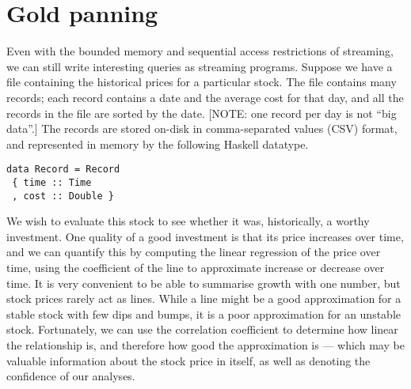 

\section{Gold panning}
Even with the bounded memory and sequential access restrictions of streaming, we can still write interesting queries as streaming programs.
Suppose we have a file containing the historical prices for a particular stock.
The file contains many records; each record contains a date and the average cost for that day, and all the records in the file are sorted by the date.
[NOTE: one record per day is not ``big data''.]
The records are stored on-disk in comma-separated values (CSV) format, and represented in memory by the following Haskell datatype.

\begin{lstlisting}
data Record = Record
 { time :: Time
 , cost :: Double }
\end{lstlisting}

We wish to evaluate this stock to see whether it was, historically, a worthy investment.
One quality of a good investment is that its price increases over time, and we can quantify this by computing the linear regression of the price over time, using the coefficient of the line to approximate increase or decrease over time.
It is very convenient to be able to summarise growth with one number, but stock prices rarely act as lines.
While a line might be a good approximation for a stable stock with few dips and bumps, it is a poor approximation for an unstable stock.
Fortunately, we can use the correlation coefficient to determine how linear the relationship is, and therefore how good the approximation is --- which may be valuable information about the stock price in itself, as well as denoting the confidence of our analyses.

